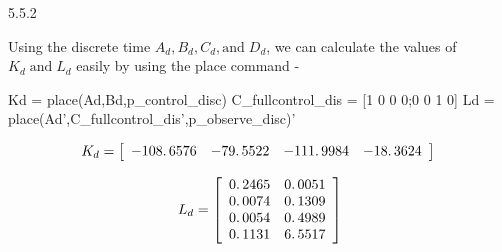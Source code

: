 \documentclass[11pt]{article}
\begin{document}
\vspace{1em}

\begin{par}
	\begin{flushleft}
		5.5.2
	\end{flushleft}
\end{par}

\begin{par}
	\begin{flushleft}
		Using the discrete time $A_d ,B_d ,C_d ,\mathrm{and}\;D_d$, we can calculate the values of $K_d \;\mathrm{and}\;L_d$ easily by using the place command - 
	\end{flushleft}
\end{par}


\begin{par}
	 $$$$
	Kd = place(Ad,Bd,p\_control\_disc)
	\newline
	\newline
	C\_fullcontrol\_dis = [1 0 0 0;0 0 1 0]
	\newline
	\newline
	Ld = place(Ad',C\_fullcontrol\_dis',p\_observe\_disc)'
	
	\vspace{1em}
\end{par}
\begin{par}
	$$K_d =\left\lbrack \begin{array}{cccc}\linebreak 
	-108\ldotp 6576 & -79\ldotp 5522 & -111\ldotp 9984 & -18\ldotp 3624\linebreak 
	\end{array}\right\rbrack \;$$
\end{par}

\vspace{1em}

\begin{par}
	$$L_d =\left\lbrack \begin{array}{cc}\linebreak 
	0\ldotp 2465 & 0\ldotp 0051\\\linebreak 
	0\ldotp 0074 & 0\ldotp 1309\\\linebreak 
	0\ldotp 0054 & 0\ldotp 4989\\\linebreak 
	0\ldotp 1131 & 6\ldotp 5517\linebreak 
	\end{array}\right\rbrack$$
\end{par}
\end{document}
